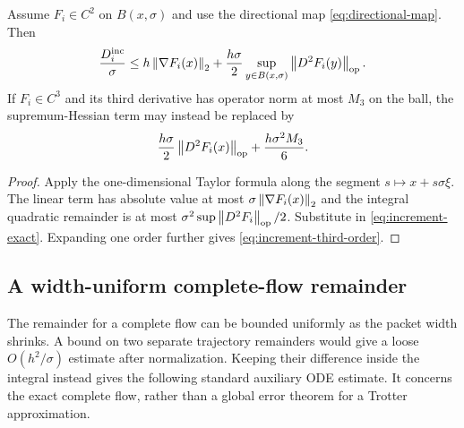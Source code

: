 \begin{proposition}
\label{prop:increment-bound}
Assume $F_i\in C^2$ on $B(x,\sigma)$ and use the directional map
\eqref{eq:directional-map}. Then
\begin{equation}
 \frac{D_i^{\rm inc}}{\sigma}
 \leq h\left\lVert \nabla F_i(x)\right\rVert_2+
 \frac{h\sigma}{2}
 \sup_{y\in B(x,\sigma)}\left\lVert D^2F_i(y)\right\rVert_{\rm op}.
 \label{eq:increment-bound}
\end{equation}
If $F_i\in C^3$ and its third derivative has operator norm at most $M_3$
on the ball, the supremum-Hessian term may instead be replaced by
\begin{equation}
 \frac{h\sigma}{2}\left\lVert D^2F_i(x)\right\rVert_{\rm op}
 +\frac{h\sigma^2M_3}{6}.
 \label{eq:increment-third-order}
\end{equation}
\end{proposition}

\begin{proof}
Apply the one-dimensional Taylor formula along the segment
$s\mapsto x+s\sigma\xi$. The linear term has absolute value at most
$\sigma\left\lVert \nabla F_i(x)\right\rVert_2$ and the integral quadratic remainder is
at most $\sigma^2\sup\left\lVert D^2F_i\right\rVert_{\rm op}/2$.
Substitute in \eqref{eq:increment-exact}. Expanding one order further gives
\eqref{eq:increment-third-order}.
\end{proof}

\subsection{A width-uniform complete-flow remainder}
The remainder for a complete flow can be bounded uniformly as the packet
width shrinks. A bound on two separate trajectory remainders would give a
loose $O(h^2/\sigma)$ estimate after normalization. Keeping their difference
inside the integral instead gives the following standard auxiliary ODE
estimate. It concerns the exact complete flow, rather than a global error
theorem for a Trotter approximation.

